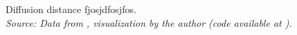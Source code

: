\begin{figure}[H]
 \caption{Diffusion distance fjosjdfosjfos.\\ 
 \textit{Source: Data from \citep{kakusan}, visualization by the author (code available at \cite{mygit}).}}
 \label{fig:diff_dist}
\end{figure}
